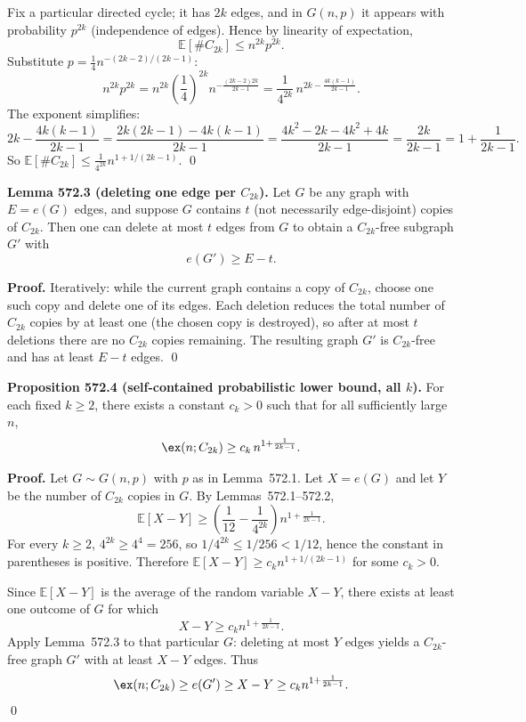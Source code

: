 Fix a particular directed cycle; it has $2k$ edges, and in $G(n,p)$ it appears with probability $p^{2k}$ (independence of edges). Hence by linearity of expectation,
\[
\mathbb E[\#C_{2k}] \le n^{2k} p^{2k}.
\]
Substitute $p=\frac{1}{4}n^{-(2k-2)/(2k-1)}$:
\[
n^{2k}p^{2k} = n^{2k}\left(\frac{1}{4}\right)^{2k} n^{-\frac{(2k-2)2k}{2k-1}}
= \frac{1}{4^{2k}}\,n^{2k-\frac{4k(k-1)}{2k-1}}.
\]
The exponent simplifies:
\[
2k-\frac{4k(k-1)}{2k-1} = \frac{2k(2k-1)-4k(k-1)}{2k-1} = \frac{4k^2-2k-4k^2+4k}{2k-1} = \frac{2k}{2k-1} = 1+\frac{1}{2k-1}.
\]
So $\mathbb E[\#C_{2k}]\le \frac{1}{4^{2k}} n^{1+1/(2k-1)}$.
\qed

\medskip

\textbf{Lemma 572.3 (deleting one edge per $C_{2k}$).}
Let $G$ be any graph with $E=e(G)$ edges, and suppose $G$ contains $t$ (not necessarily edge-disjoint) copies of $C_{2k}$. Then one can delete at most $t$ edges from $G$ to obtain a $C_{2k}$-free subgraph $G'$ with
\[
e(G')\ge E-t.
\]

\textbf{Proof.}
Iteratively: while the current graph contains a copy of $C_{2k}$, choose one such copy and delete one of its edges. Each deletion reduces the total number of $C_{2k}$ copies by at least one (the chosen copy is destroyed), so after at most $t$ deletions there are no $C_{2k}$ copies remaining. The resulting graph $G'$ is $C_{2k}$-free and has at least $E-t$ edges.
\qed

\medskip

\textbf{Proposition 572.4 (self-contained probabilistic lower bound, all $k$).}
For each fixed $k\ge 2$, there exists a constant $c_k>0$ such that for all sufficiently large $n$,
\[
\ex(n;C_{2k}) \ge c_k\,n^{1+\frac{1}{2k-1}}.
\]

\textbf{Proof.}
Let $G\sim G(n,p)$ with $p$ as in Lemma~572.1. Let $X=e(G)$ and let $Y$ be the number of $C_{2k}$ copies in $G$. By Lemmas~572.1--572.2,
\[
\mathbb E[X-Y] \ge \left(\frac{1}{12}-\frac{1}{4^{2k}}\right) n^{1+\frac{1}{2k-1}}.
\]
For every $k\ge 2$, $4^{2k}\ge 4^4=256$, so $1/4^{2k}\le 1/256 < 1/12$, hence the constant in parentheses is positive. Therefore $\mathbb E[X-Y]\ge c_k n^{1+1/(2k-1)}$ for some $c_k>0$.

Since $\mathbb E[X-Y]$ is the average of the random variable $X-Y$, there exists at least one outcome of $G$ for which
\[
X-Y \ge c_k n^{1+\frac{1}{2k-1}}.
\]
Apply Lemma~572.3 to that particular $G$: deleting at most $Y$ edges yields a $C_{2k}$-free graph $G'$ with at least $X-Y$ edges. Thus
\[
\ex(n;C_{2k}) \ge e(G') \ge X-Y \ge c_k n^{1+\frac{1}{2k-1}}.
\]
\qed

